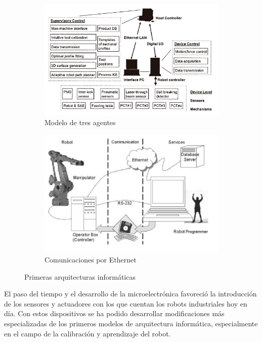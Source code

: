     \begin{figure}[h!]
        \centering
         \begin{subfigure}[h]{0.45\linewidth} 
            \centering
            \includegraphics[scale=0.50]{figuras/modelo_arquitectura_antiguo.jpg}
            \caption{Modelo de tres agentes \cite{Huang_2003}}
            \label{fig:modelo_arquitectura_antiguo}
        \end{subfigure}
        \begin{subfigure}[h]{0.45\linewidth} 
            \centering
            \includegraphics[scale=0.65]{figuras/arquitectura_ethernet.jpg}
            \caption{Comunicaciones por Ethernet \cite{Santos_2005}}
            \label{fig:arquitectura_ethernet}
        \end{subfigure}
        \caption{Primeras arquitecturas informáticas}
    \end{figure}

El paso del tiempo y el desarrollo de la microelectrónica favoreció la introducción de los sensores y actuadores con los que cuentan los robots industriales hoy en día. Con estos dispositivos se ha podido desarrollar modificaciones más especializadas de los primeros modelos de arquitectura informática, especialmente en el campo de la calibración y aprendizaje del robot.  

